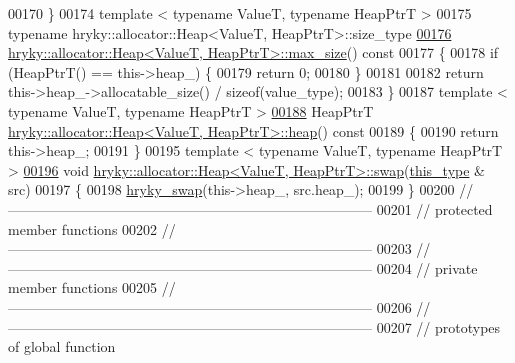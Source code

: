 \begin{DoxyCode}
00170 \}
00174 \textcolor{keyword}{template} < \textcolor{keyword}{typename} ValueT, \textcolor{keyword}{typename} HeapPtrT >
00175 \textcolor{keyword}{typename} hryky::allocator::Heap<ValueT, HeapPtrT>::size\_type
\hypertarget{allocator__heap_8h_source_l00176}{}\hyperlink{classhryky_1_1allocator_1_1_heap_a6e2a6c2d9a4d9542059b28fca4c4a2d6}{00176} \hyperlink{classhryky_1_1allocator_1_1_heap}{hryky::allocator::Heap<ValueT, HeapPtrT>::max_size}()\textcolor{keyword}{ const}
00177 \textcolor{keyword}{}\{
00178     \textcolor{keywordflow}{if} (HeapPtrT() == this->heap\_) \{
00179         \textcolor{keywordflow}{return} 0;
00180     \}
00181 
00182     \textcolor{keywordflow}{return} this->heap\_->allocatable\_size() / \textcolor{keyword}{sizeof}(value\_type);
00183 \}
00187 \textcolor{keyword}{template} < \textcolor{keyword}{typename} ValueT, \textcolor{keyword}{typename} HeapPtrT >
\hypertarget{allocator__heap_8h_source_l00188}{}\hyperlink{classhryky_1_1allocator_1_1_heap_a8e298fe26a676998b9bc5178c79961dc}{00188} HeapPtrT \hyperlink{namespacehryky_1_1memory_1_1global_a6fc6103f67c837aa0f39b359588409cd}{hryky::allocator::Heap<ValueT, HeapPtrT>::heap}()\textcolor{keyword}{ const}
00189 \textcolor{keyword}{}\{
00190     \textcolor{keywordflow}{return} this->heap\_;
00191 \}
00195 \textcolor{keyword}{template} < \textcolor{keyword}{typename} ValueT, \textcolor{keyword}{typename} HeapPtrT >
\hypertarget{allocator__heap_8h_source_l00196}{}\hyperlink{classhryky_1_1allocator_1_1_heap_a855528bfa428ad5289cbdff073311d68}{00196} \textcolor{keywordtype}{void} \hyperlink{namespacehryky_a4282146df5ea2b68cb667896a2205909}{hryky::allocator::Heap<ValueT, HeapPtrT>::swap}(\hyperlink{classhryky_1_1allocator_1_1_base}{this_type} & src)
00197 \{
00198     \hyperlink{namespacehryky_add9c1c1fdfda07cd47bcb7c16d3a823a}{hryky_swap}(this->heap\_, src.heap\_);
00199 \}
00200 \textcolor{comment}{//
      ------------------------------------------------------------------------------}
00201 \textcolor{comment}{// protected member functions}
00202 \textcolor{comment}{//
      ------------------------------------------------------------------------------}
00203 \textcolor{comment}{//
      ------------------------------------------------------------------------------}
00204 \textcolor{comment}{// private member functions}
00205 \textcolor{comment}{//
      ------------------------------------------------------------------------------}
00206 \textcolor{comment}{//
      ------------------------------------------------------------------------------}
00207 \textcolor{comment}{// prototypes of global function}

\end{DoxyCode}

